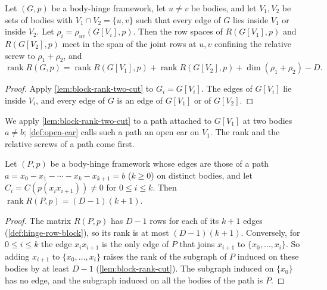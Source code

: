 \begin{corollary}
  \label{cor:block-rank-vertex-two-cut}
  \leanok
  Let $(G,p)$ be a body-hinge framework, let $u \neq v$ be bodies, and
  let $V_1, V_2$ be sets of bodies with $V_1 \cap V_2 = \{u, v\}$ such
  that every edge of $G$ lies inside $V_1$ or inside $V_2$. Let
  $\rho_i = \rho_{uv}(G[V_i], p)$. Then the row spaces of $R(G[V_1],p)$
  and $R(G[V_2],p)$ meet in the span of the joint rows at $u, v$
  confining the relative screw to $\rho_1 + \rho_2$, and
  \[
    \operatorname{rank} R(G,p) = \operatorname{rank} R(G[V_1],p)
    + \operatorname{rank} R(G[V_2],p) + \dim(\rho_1 + \rho_2) - D.
  \]
\end{corollary}
\begin{proof}
  \leanok
  Apply \cref{lem:block-rank-two-cut} to $G_i = G[V_i]$. The edges of
  $G[V_i]$ lie inside $V_i$, and every edge of $G$ is an edge of
  $G[V_1]$ or of $G[V_2]$.
\end{proof}

We apply \cref{lem:block-rank-two-cut} to a path attached to $G[V_1]$ at
two bodies $a \neq b$; \cref{def:open-ear} calls such a path
an open ear on $V_1$. The rank and the relative screws of a path come
first.

\begin{lemma}
  \label{lem:block-rank-path}
  \leanok
  Let $(P,p)$ be a body-hinge framework whose edges are those of a path
  $a = x_0 - x_1 - \cdots - x_k - x_{k+1} = b$ ($k \geq 0$) on distinct
  bodies, and let $C_i = C(p(x_i x_{i+1})) \neq 0$ for
  $0 \le i \le k$. Then $\operatorname{rank} R(P,p) = (D-1)(k+1)$.
\end{lemma}
\begin{proof}
  \leanok
  The matrix $R(P,p)$ has $D - 1$ rows for each of its $k + 1$ edges
  (\cref{def:hinge-row-block}), so its rank is at most $(D-1)(k+1)$.
  Conversely, for $0 \le i \le k$ the edge $x_i x_{i+1}$ is the only edge
  of $P$ that joins $x_{i+1}$ to $\{x_0, \dots, x_i\}$. So adding
  $x_{i+1}$ to $\{x_0, \dots, x_i\}$ raises the rank of the subgraph of
  $P$ induced on these bodies by at least $D - 1$
  (\cref{lem:block-rank-cut}). The subgraph induced on $\{x_0\}$ has no
  edge, and the subgraph induced on all the bodies of the path is $P$.
\end{proof}

